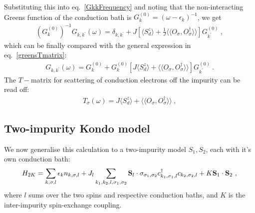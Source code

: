 Substituting this into eq.~\ref{GkkFrequency} and noting that the non-interacting Greens function of the conduction bath is \(G^{(0)}_k = (\omega - \epsilon_k)^{-1}\), we get
\begin{equation}\begin{aligned}
	(G^{(0)}_k)^{-1} G_{k,k^\prime}(\omega) = \delta_{k,k^\prime} + J\left[\langle S_d^z \rangle + \frac{1}{J} \langle \langle O_\sigma, O^\dagger_\sigma \rangle  \rangle\right]G^{(0)}_{k^\prime}~,
\end{aligned}\end{equation}
which can be finally compared with the general expression in eq.~\ref{greensTmatrix}:
\begin{equation}\begin{aligned}
	G_{k,k^\prime}(\omega) = G^{(0)}_k + G^{(0)}_k\left[J\langle S_d^z \rangle + \langle \langle O_\sigma, O^\dagger_\sigma \rangle  \rangle\right]G^{(0)}_{k^\prime}~.
\end{aligned}\end{equation}
The \(T-\)matrix for scattering of conduction electrons off the impurity can be read off:
\begin{equation}\begin{aligned}
T_\sigma(\omega) = J\langle S_d^z \rangle + \langle \langle O_\sigma, O^\dagger_\sigma \rangle  \rangle~,
\end{aligned}\end{equation}

\subsection{Two-impurity Kondo model}
We now generalise this calculation to a two-impurity model \(S_1, S_2\), each with it's own conduction bath:
\begin{equation}\begin{aligned}
	H_{2K} = \sum_{k,\sigma,l}\epsilon_k n_{k,\sigma,l} + J_l\sum_{k_1,k_2,l,\sigma_1,\sigma_2} {\bf S}_l \cdot {\bf \sigma}_{\sigma_1,\sigma_2} c^\dagger_{k_1,\sigma_1,l}c_{k_2,\sigma_2,l} + K {\bf S}_1 \cdot {\bf S}_2~,
\end{aligned}\end{equation}
where \(l\) sums over the two spins and respective conduction baths, and \(K\) is the inter-impurity spin-exchange coupling.

